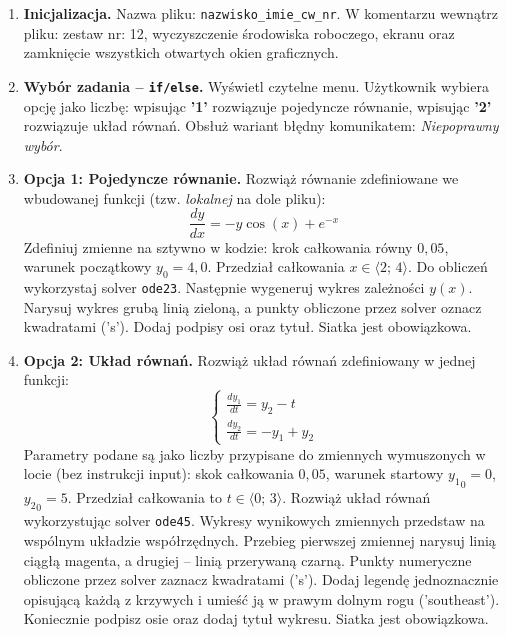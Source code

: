 \documentclass[a4paper,11pt]{article}
\begin{document}
\begin{enumerate}[leftmargin=*, label=\textbf{\arabic*.}, itemsep=2pt]

  \item \textbf{Inicjalizacja.}
    Nazwa pliku: \texttt{nazwisko\_imie\_cw\_nr}. W komentarzu wewnątrz pliku: zestaw nr: 12, wyczyszczenie środowiska roboczego, ekranu oraz zamknięcie wszystkich otwartych okien graficznych.

  \item \textbf{Wybór zadania -- \texttt{if/else}.}
    Wyświetl czytelne menu. Użytkownik wybiera opcję jako liczbę: wpisując \textbf{'1'} rozwiązuje pojedyncze równanie, wpisując \textbf{'2'} rozwiązuje układ równań. Obsłuż wariant błędny komunikatem: \textit{Niepoprawny wybór}.

  \item \textbf{Opcja 1: Pojedyncze równanie.}
    Rozwiąż równanie zdefiniowane we wbudowanej funkcji (tzw. \textit{lokalnej} na dole pliku):
    \[ \frac{dy}{dx} = -y\cos(x) + e^{-x} \]
    Zdefiniuj zmienne na sztywno w kodzie: krok całkowania równy $0{,}05$, warunek początkowy $y_0 = 4{,}0$. Przedział całkowania $x \in \langle 2;\,4 \rangle$.
    Do obliczeń wykorzystaj solver \texttt{ode23}. Następnie wygeneruj wykres zależności $y(x)$. Narysuj wykres grubą linią zieloną, a punkty obliczone przez solver oznacz kwadratami ('s'). Dodaj podpisy osi oraz tytuł. Siatka jest obowiązkowa.

  \item \textbf{Opcja 2: Układ równań.}
    Rozwiąż układ równań zdefiniowany w jednej funkcji:\\[-0.5em]
    \[
    \begin{cases}
      \frac{dy_1}{dt} = y_2 - t \\
      \frac{dy_2}{dt} = -y_1 + y_2
    \end{cases}
    \]
    Parametry podane są jako liczby przypisane do zmiennych wymuszonych w locie (bez instrukcji input): skok całkowania $0{,}05$, warunek startowy $ {y_1}_{0} = 0 $, $ {y_2}_{0} = 5 $. Przedział całkowania to $t \in \langle 0;\,3 \rangle$.
    Rozwiąż układ równań wykorzystując solver \texttt{ode45}. Wykresy wynikowych zmiennych przedstaw na wspólnym układzie współrzędnych. Przebieg pierwszej zmiennej narysuj linią ciągłą magenta, a drugiej -- linią przerywaną czarną. Punkty numeryczne obliczone przez solver zaznacz kwadratami ('s'). Dodaj legendę jednoznacznie opisującą każdą z krzywych i umieść ją w prawym dolnym rogu ('southeast'). Koniecznie podpisz osie oraz dodaj tytuł wykresu. Siatka jest obowiązkowa.

\end{enumerate}
\end{document}
